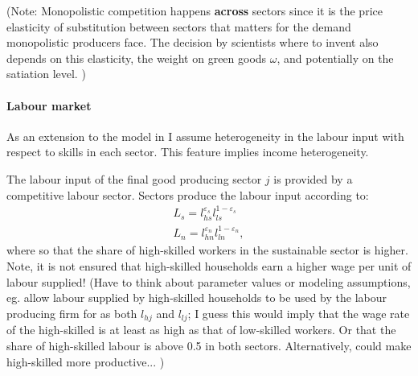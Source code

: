 (Note: Monopolistic competition happens \textbf{across} sectors since it is the price elasticity of substitution between sectors that matters for the demand monopolistic producers face.
The decision by scientists where to invent also depends on this elasticity, the weight on green goods $\omega$, and potentially on the satiation level. 
)
\paragraph{Labour market}
As an extension to the model in \cite{Acemoglu2012TheChange} I assume heterogeneity in the labour input with respect to skills in each sector. This feature implies income heterogeneity. 
\begin{comment}
\begin{align*}
H_s= \lambda z_h l_r\\
H_n= (1-\lambda) z_l l_p
\end{align*}
\ar could have that in the initial ss wages in the low sector are higher since less labour is available with $z_l<z_h$. Either allow rich also to work there... or drop $z_h, z_l$. For now, drop $z_h, z_l$ and see what comes out from the simple setup, then think about how to adjust it if need be/ to make it more realistic.

\end{comment}
The labour input of the final good producing sector $j$ is provided by a competitive labour sector. Sectors produce the labour input according to: 
\begin{align*}
L_s= l_{hs}^{\varepsilon_s}l_{ls}^{1-\varepsilon_s}\\
L_n=l_{hn}^{\varepsilon_n}l_{ln}^{1-\varepsilon_n},
\end{align*}
where  so that the share of high-skilled workers in the sustainable sector is higher.
Note, it is not ensured that high-skilled households earn a higher wage per unit of labour supplied! (Have to think about parameter values or modeling assumptions, eg. allow labour supplied by high-skilled households to be used by the labour producing firm for as both $l_{hj}$ and $l_{lj}$; I guess this would imply that the wage rate of the high-skilled is at least as high as that of low-skilled workers. Or that the share of high-skilled labour is above 0.5 in both sectors. Alternatively, could make high-skilled more productive... )

